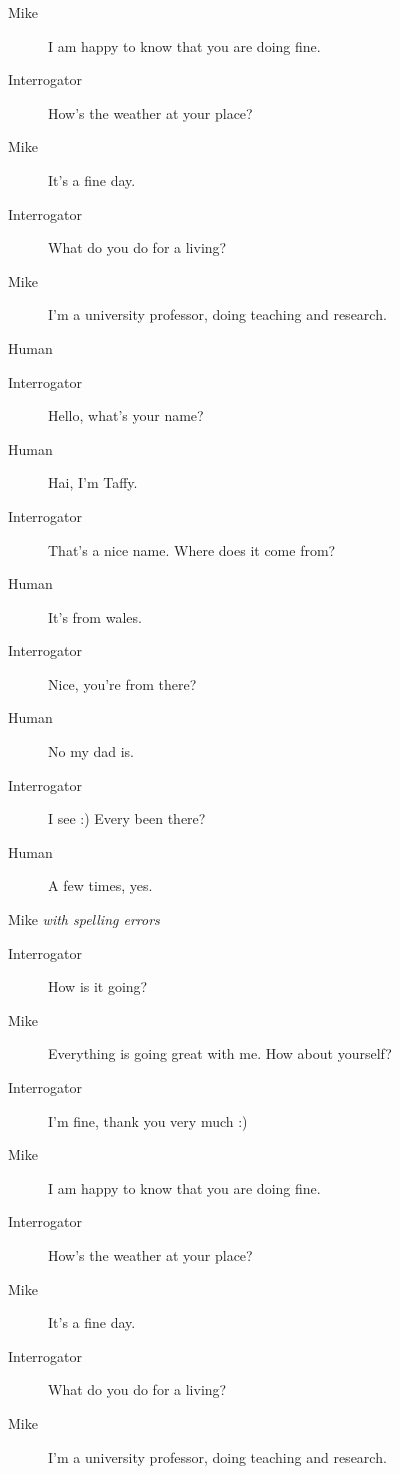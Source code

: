 \begin{itemize}
\begin{description}
\begin{description}
               \item [Mike] I am happy to know that you are doing fine.
               \item [Interrogator] How's the weather at your place?
               \item [Mike] It's a fine day.
               \item [Interrogator] What do you do for a living?
               \item [Mike] I'm a university professor, doing teaching and research.
            \end{description}
         \item [Second conversation] Human
            \begin{description}
               \item [Interrogator] Hello, what's your name?
               \item [Human] Hai, I'm Taffy.
               \item [Interrogator] That's a nice name. Where does it come from?
               \item [Human] It's from wales.
               \item [Interrogator] Nice, you're from there?
               \item [Human] No my dad is.
               \item [Interrogator] I see :) Every been there?
               \item [Human] A few times, yes.
            \end{description}
         \item [Second conversation] Mike \textit{with spelling errors}
            \begin{description}
               \item [Interrogator] How is it going?
               \item [Mike] Everything is going great with me. How about yourself?
               \item [Interrogator] I'm fine, thank you very much :)
               \item [Mike] I am happy to know that you are doing fine.
               \item [Interrogator] How's the weather at your place?
               \item [Mike] It's a fine day.
               \item [Interrogator] What do you do for a living?
               \item [Mike] I'm a university professor, doing teaching and research.
            \end{description}
      \end{description}


\end{itemize}
